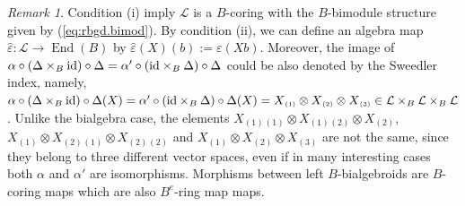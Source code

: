 \documentclass[a4paper,reqno]{amsart}
\newcommand*{\id}{\textup{id}}
\numberwithin{equation}{section}
\theoremstyle{plain}
\theoremstyle{remark}
\newtheorem{rem}[thm]{Remark}
\numberwithin{equation}{section}
\newcommand{\ot}{\otimes}
\newcommand{\cL}{\mathcal{L}}
\renewcommand{\o}{{}_{\scriptscriptstyle{(1)}}}
\renewcommand{\t}{{}_{\scriptscriptstyle{(2)}}}
\renewcommand{\th}{{}_{\scriptscriptstyle{(3)}}}
\begin{document}
\begin{rem}
   Condition (i) imply $\cL$ is a $B$-coring with the $B$-bimodule structure given by (\ref{eq:rbgd.bimod}). By condition (ii), we can define an algebra map $\hat{\varepsilon}: \cL\to \operatorname{End}(B)$ by $\hat{\varepsilon}(X)(b):=\varepsilon(X b)$. Moreover, the image of $\alpha\circ(\Delta\times_{B}\id)\circ\Delta=\alpha'\circ(\id\times_{B}\Delta)\circ\Delta$ could be also denoted by the Sweedler index, namely, $\alpha\circ(\Delta\times_{B}\id)\circ\Delta(X)=\alpha'\circ(\id\times_{B}\Delta)\circ\Delta(X)=X\o\ot X\t\ot X\th\in \cL\times_{B}\cL\times_{B}\cL$. Unlike the bialgebra case, the elements $X\o\o\ot X\o\t\ot X\t$, $X\o\ot X\t\o\ot X\t\t$ and $X\o\ot X\t\ot X\th$ are not the same, since they belong to three different vector spaces, even if in many interesting cases both $\alpha$ and $\alpha'$ are isomorphisms.
   Morphisms between left $B$-bialgebroids are $B$-coring maps which are also $B^e$-ring map maps.
\end{rem}

\end{document}
